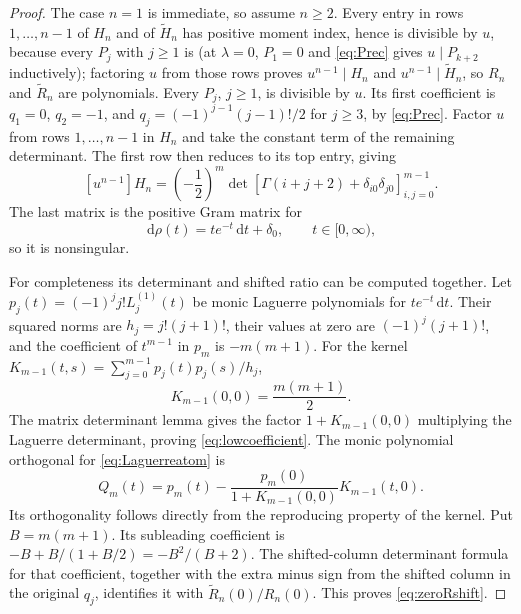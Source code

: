 \documentclass[11pt]{article}
\numberwithin{equation}{section}
\theoremstyle{remark}
\newcommand{\dd}{\,\mathrm{d}}
\newcommand{\wt}{\widetilde}
\begin{document}
\begin{proof}
The case $n=1$ is immediate, so assume $n\ge2$. Every entry in rows
$1,\ldots,n-1$ of $H_n$ and of $\wt H_n$ has positive moment index, hence
is divisible by $u$, because every $P_j$ with $j\ge1$ is (at $\lambda=0$,
$P_1=0$ and \eqref{eq:Prec} gives $u\mid P_{k+2}$ inductively); factoring $u$ from those rows proves
$u^{n-1}\mid H_n$ and $u^{n-1}\mid\wt H_n$, so $R_n$ and $\wt R_n$ are
polynomials.
Every $P_j$, $j\ge1$, is divisible by $u$. Its first coefficient is
$q_1=0$, $q_2=-1$, and
$q_j=(-1)^{j-1}(j-1)!/2$ for $j\ge3$, by \eqref{eq:Prec}.
Factor $u$ from rows $1,\ldots,n-1$ in $H_n$ and take the constant
term of the remaining determinant. The first row then reduces to
its top entry, giving
\[
 [u^{n-1}]H_n=
 \left(-\frac12\right)^m
 \det[\Gamma(i+j+2)+\delta_{i0}\delta_{j0}]_{i,j=0}^{m-1}.
\]
The last matrix is the positive Gram matrix for
\begin{equation}\label{eq:Laguerreatom}
                         \dd\rho(t)=te^{-t}\dd t+\delta_0,
                         \qquad t\in[0,\infty),
\end{equation}
so it is nonsingular.

For completeness its determinant and shifted ratio can be computed
together. Let $p_j(t)=(-1)^jj!L_j^{(1)}(t)$ be monic Laguerre
polynomials for $te^{-t}\dd t$. Their squared norms are
$h_j=j!(j+1)!$, their values at zero are $(-1)^j(j+1)!$, and the
coefficient of $t^{m-1}$ in $p_m$ is $-m(m+1)$. For the kernel
$K_{m-1}(t,s)=\sum_{j=0}^{m-1}p_j(t)p_j(s)/h_j$,
\[
                         K_{m-1}(0,0)=\frac{m(m+1)}2.
\]
The matrix determinant lemma gives the factor
$1+K_{m-1}(0,0)$ multiplying the Laguerre determinant, proving
\eqref{eq:lowcoefficient}. The monic polynomial orthogonal for
\eqref{eq:Laguerreatom} is
\[
 Q_m(t)=p_m(t)-\frac{p_m(0)}{1+K_{m-1}(0,0)}K_{m-1}(t,0).
\]
Its orthogonality follows directly from the reproducing property of
the kernel. Put $B=m(m+1)$. Its subleading coefficient is
$-B+B/(1+B/2)=-B^2/(B+2)$.
The shifted-column determinant formula for that coefficient,
together with the extra minus sign from the shifted column in the
original $q_j$, identifies it with $\wt R_n(0)/R_n(0)$.
This proves \eqref{eq:zeroRshift}.
\end{proof}
\end{document}
